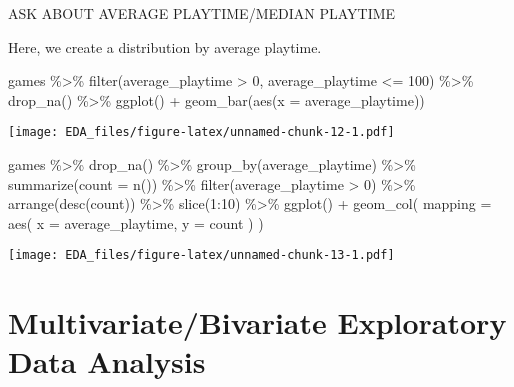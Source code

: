 \documentclass[
]{article}
\newenvironment{Shaded}{\begin{snugshade}}{\end{snugshade}}
\newcommand{\AttributeTok}[1]{\textcolor[rgb]{0.77,0.63,0.00}{#1}}
\newcommand{\DecValTok}[1]{\textcolor[rgb]{0.00,0.00,0.81}{#1}}
\newcommand{\FunctionTok}[1]{\textcolor[rgb]{0.00,0.00,0.00}{#1}}
\newcommand{\NormalTok}[1]{#1}
\newcommand{\SpecialCharTok}[1]{\textcolor[rgb]{0.00,0.00,0.00}{#1}}
\begin{document}
ASK ABOUT AVERAGE PLAYTIME/MEDIAN PLAYTIME

Here, we create a distribution by average playtime.

\begin{Shaded}
\begin{Highlighting}[]
\NormalTok{games }\SpecialCharTok{\%\textgreater{}\%}
  \FunctionTok{filter}\NormalTok{(average\_playtime }\SpecialCharTok{\textgreater{}} \DecValTok{0}\NormalTok{, average\_playtime }\SpecialCharTok{\textless{}=} \DecValTok{100}\NormalTok{) }\SpecialCharTok{\%\textgreater{}\%}
  \FunctionTok{drop\_na}\NormalTok{() }\SpecialCharTok{\%\textgreater{}\%}
  \FunctionTok{ggplot}\NormalTok{() }\SpecialCharTok{+}
  \FunctionTok{geom\_bar}\NormalTok{(}\FunctionTok{aes}\NormalTok{(}\AttributeTok{x =}\NormalTok{ average\_playtime))}
\end{Highlighting}
\end{Shaded}

\texttt{[image: EDA\_files/figure-latex/unnamed-chunk-12-1.pdf]}

\begin{Shaded}
\begin{Highlighting}[]
\NormalTok{games }\SpecialCharTok{\%\textgreater{}\%}
  \FunctionTok{drop\_na}\NormalTok{() }\SpecialCharTok{\%\textgreater{}\%}
  \FunctionTok{group\_by}\NormalTok{(average\_playtime) }\SpecialCharTok{\%\textgreater{}\%}
  \FunctionTok{summarize}\NormalTok{(}\AttributeTok{count =} \FunctionTok{n}\NormalTok{()) }\SpecialCharTok{\%\textgreater{}\%}
  \FunctionTok{filter}\NormalTok{(average\_playtime }\SpecialCharTok{\textgreater{}} \DecValTok{0}\NormalTok{) }\SpecialCharTok{\%\textgreater{}\%}
  \FunctionTok{arrange}\NormalTok{(}\FunctionTok{desc}\NormalTok{(count)) }\SpecialCharTok{\%\textgreater{}\%}
  \FunctionTok{slice}\NormalTok{(}\DecValTok{1}\SpecialCharTok{:}\DecValTok{10}\NormalTok{) }\SpecialCharTok{\%\textgreater{}\%}
  \FunctionTok{ggplot}\NormalTok{() }\SpecialCharTok{+}
  \FunctionTok{geom\_col}\NormalTok{(}
    \AttributeTok{mapping =} \FunctionTok{aes}\NormalTok{(}
      \AttributeTok{x =}\NormalTok{ average\_playtime,}
      \AttributeTok{y =}\NormalTok{ count}
\NormalTok{    )}
\NormalTok{  ) }
\end{Highlighting}
\end{Shaded}

\texttt{[image: EDA\_files/figure-latex/unnamed-chunk-13-1.pdf]}

\hypertarget{multivariatebivariate-exploratory-data-analysis}{%
\section{Multivariate/Bivariate Exploratory Data
Analysis}\label{multivariatebivariate-exploratory-data-analysis}}
\end{document}
